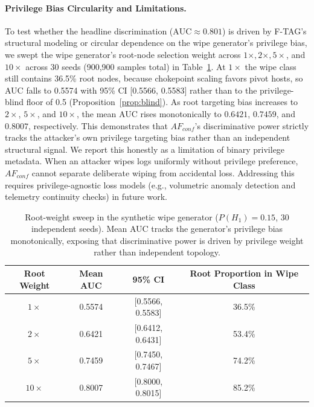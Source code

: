 \documentclass[12pt]{article}
\begin{document}
\paragraph{Privilege Bias Circularity and Limitations.}
To test whether the headline discrimination ($\text{AUC} \approx 0.801$) is driven by F-TAG's structural modeling or circular dependence on the wipe generator's privilege bias, we swept the wipe generator's root-node selection weight across $1\times, 2\times, 5\times$, and $10\times$ across 30 seeds (900,900 samples total) in Table~\ref{tab:root-sweep}. At $1\times$ the wipe class still contains 36.5\% root nodes, because chokepoint scaling favors pivot hosts, so AUC falls to 0.5574 with 95\% CI [0.5566, 0.5583] rather than to the privilege-blind floor of 0.5 (Proposition~\ref{prop:blind}). As root targeting bias increases to $2\times$, $5\times$, and $10\times$, the mean AUC rises monotonically to $0.6421$, $0.7459$, and $0.8007$, respectively. This demonstrates that $AF_{conf}$'s discriminative power strictly tracks the attacker's own privilege targeting bias rather than an independent structural signal. We report this honestly as a limitation of binary privilege metadata. When an attacker wipes logs uniformly without privilege preference, $AF_{conf}$ cannot separate deliberate wiping from accidental loss. Addressing this requires privilege-agnostic loss models (e.g., volumetric anomaly detection and telemetry continuity checks) in future work.

\begin{table}[t]
\centering
\caption{Root-weight sweep in the synthetic wipe generator ($P(H_1) = 0.15$, 30 independent seeds). Mean AUC tracks the generator's privilege bias monotonically, exposing that discriminative power is driven by privilege weight rather than independent topology.}
\label{tab:root-sweep}
\footnotesize
\begin{tabular}{cccc}
\toprule
\textbf{Root Weight} & \textbf{Mean AUC} & \textbf{95\% CI} & \textbf{Root Proportion in Wipe Class} \\
\midrule
$1\times$  & 0.5574 & [0.5566, 0.5583] & 36.5\% \\
$2\times$  & 0.6421 & [0.6412, 0.6431] & 53.4\% \\
$5\times$  & 0.7459 & [0.7450, 0.7467] & 74.2\% \\
$10\times$ & 0.8007 & [0.8000, 0.8015] & 85.2\% \\
\bottomrule
\end{tabular}
\end{table}
\end{document}
